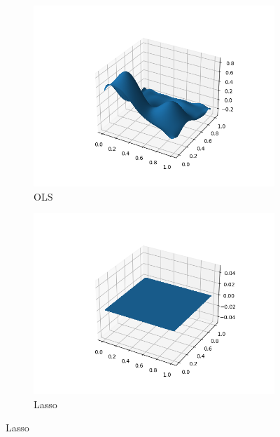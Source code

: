 \documentclass[../main.tex]{subfiles}
\begin{document}
\begin{figure}[htb!]
    \centering
    \begin{subfigure}[b]{0.48\textwidth}
        \centering
        \includegraphics[trim=2.4cm 1cm 1.4cm 1cm, clip,width=1.1\textwidth]{../assets/ols_franke_plot.png}
        \caption{OLS}
        \label{fig:result_ols_plot}
    \end{subfigure}
    \quad
    \begin{subfigure}[b]{0.48\textwidth}
        \centering
        \includegraphics[trim=2.4cm 1cm 1.4cm 1cm, clip,width=1.1\textwidth]{../assets/lasso_franke_plot.png}
        \caption{Lasso}
    \end{subfigure}
    

\end{figure}
\end{document}
